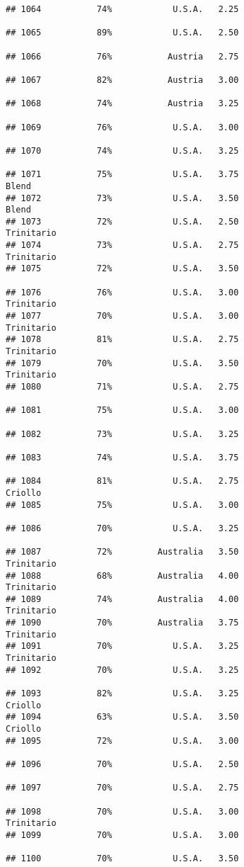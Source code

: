 \documentclass[
]{article}
\begin{document}
\begin{verbatim}
## 1064           74%            U.S.A.   2.25                         
## 1065           89%            U.S.A.   2.50                         
## 1066           76%           Austria   2.75                         
## 1067           82%           Austria   3.00                         
## 1068           74%           Austria   3.25                         
## 1069           76%            U.S.A.   3.00                         
## 1070           74%            U.S.A.   3.25                         
## 1071           75%            U.S.A.   3.75                    Blend
## 1072           73%            U.S.A.   3.50                    Blend
## 1073           72%            U.S.A.   2.50               Trinitario
## 1074           73%            U.S.A.   2.75               Trinitario
## 1075           72%            U.S.A.   3.50                         
## 1076           76%            U.S.A.   3.00               Trinitario
## 1077           70%            U.S.A.   3.00               Trinitario
## 1078           81%            U.S.A.   2.75               Trinitario
## 1079           70%            U.S.A.   3.50               Trinitario
## 1080           71%            U.S.A.   2.75                         
## 1081           75%            U.S.A.   3.00                         
## 1082           73%            U.S.A.   3.25                         
## 1083           74%            U.S.A.   3.75                         
## 1084           81%            U.S.A.   2.75                  Criollo
## 1085           75%            U.S.A.   3.00                         
## 1086           70%            U.S.A.   3.25                         
## 1087           72%         Australia   3.50               Trinitario
## 1088           68%         Australia   4.00               Trinitario
## 1089           74%         Australia   4.00               Trinitario
## 1090           70%         Australia   3.75               Trinitario
## 1091           70%            U.S.A.   3.25               Trinitario
## 1092           70%            U.S.A.   3.25                         
## 1093           82%            U.S.A.   3.25                  Criollo
## 1094           63%            U.S.A.   3.50                  Criollo
## 1095           72%            U.S.A.   3.00                         
## 1096           70%            U.S.A.   2.50                         
## 1097           70%            U.S.A.   2.75                         
## 1098           70%            U.S.A.   3.00               Trinitario
## 1099           70%            U.S.A.   3.00                         
## 1100           70%            U.S.A.   3.50                         

\end{verbatim}
\end{document}
